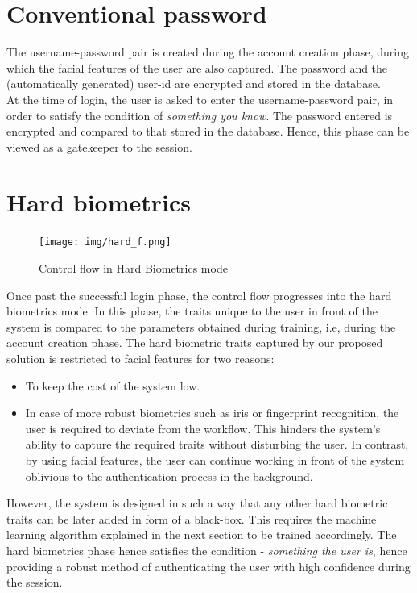 \documentclass[12pt]{report}			%
\begin{document}
\section{Conventional password}
The username-password pair is created during the account creation phase, during which the facial features of the user are also captured.
The password and the (automatically generated) user-id are encrypted and stored in the database.\\
At the time of login, the user is asked to enter the username-password pair, in order to satisfy the condition of \emph{something you know}.
The password entered is encrypted and compared to that stored in the database.
Hence, this phase can be viewed as a gatekeeper to the session. 

\section{Hard biometrics}
\begin{figure}[h!]
	\centering
	\texttt{[image: img/hard\_f.png]}
	\caption{Control flow in Hard Biometrics mode}
	\label{fig:cfhb}
\end{figure}
Once past the successful login phase, the control flow progresses into the hard biometrics mode.
In this phase, the traits unique to the user in front of the system is compared to the parameters obtained during training, i.e, during the account creation phase.
The hard biometric traits captured by our proposed solution is restricted to facial features for two reasons:
\begin{itemize}
	\item To keep the cost of the system low.
	\item In case of more robust biometrics such as iris or fingerprint recognition, the user is required to deviate from the workflow. This hinders the system's ability to capture the required traits without disturbing the user. In contrast, by using facial features, the user can continue working in front of the system oblivious to the authentication process in the background.
\end{itemize}
However, the system is designed in such a way that any other hard biometric traits can be later added in form of a black-box. This requires the machine learning algorithm explained in the next section to be trained accordingly.
The hard biometrics phase hence satisfies the condition - \emph{something the user is}, hence providing a robust method of authenticating the user with high confidence during the session.\\
\end{document}
